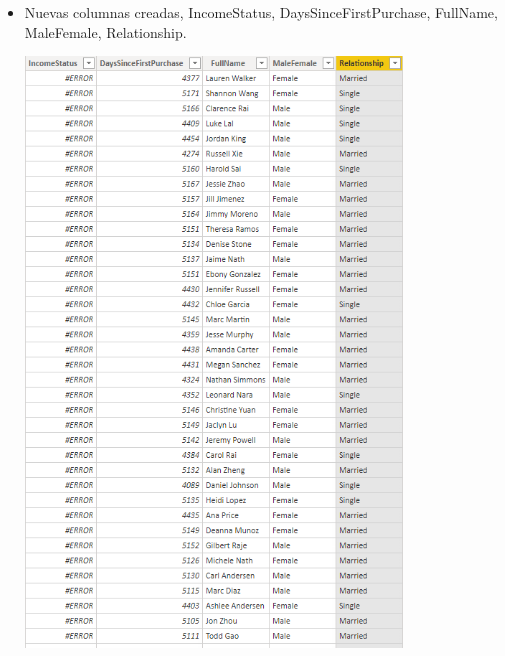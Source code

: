 \begin{itemize}
	\item Nuevas columnas creadas, IncomeStatus, DaysSinceFirstPurchase, FullName, MaleFemale, Relationship.
	\begin{center}
	\includegraphics[width=10cm]{./Imagenes/Captura3-3} 
	\end{center}
\end{itemize} 

